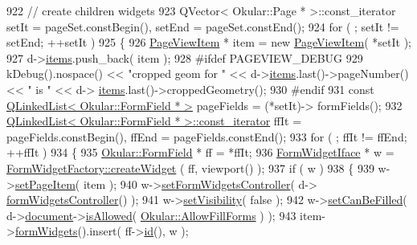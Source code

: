 \begin{DoxyCode}
922     \textcolor{comment}{// create children widgets}
923     QVector< Okular::Page * >::const\_iterator setIt = pageSet.constBegin(), setEnd = pageSet.constEnd();
924     \textcolor{keywordflow}{for} ( ; setIt != setEnd; ++setIt )
925     \{
926         \hyperlink{classPageViewItem}{PageViewItem} * item = \textcolor{keyword}{new} \hyperlink{classPageViewItem}{PageViewItem}( *setIt );
927         d->\hyperlink{classPageViewPrivate_ad90c795dead9abfaa5818a94e00435bc}{items}.push\_back( item );
928 \textcolor{preprocessor}{#ifdef PAGEVIEW\_DEBUG}
929         kDebug().nospace() << \textcolor{stringliteral}{"cropped geom for "} << d->\hyperlink{classPageViewPrivate_ad90c795dead9abfaa5818a94e00435bc}{items}.last()->pageNumber() << \textcolor{stringliteral}{" is "} << d->
      \hyperlink{classPageViewPrivate_ad90c795dead9abfaa5818a94e00435bc}{items}.last()->croppedGeometry();
930 \textcolor{preprocessor}{#endif}
931         \textcolor{keyword}{const} \hyperlink{classQLinkedList}{QLinkedList< Okular::FormField * >} pageFields = (*setIt)->
      formFields();
932         \hyperlink{classQLinkedList}{QLinkedList< Okular::FormField * >::const\_iterator}
       ffIt = pageFields.constBegin(), ffEnd = pageFields.constEnd();
933         \textcolor{keywordflow}{for} ( ; ffIt != ffEnd; ++ffIt )
934         \{
935             \hyperlink{classOkular_1_1FormField}{Okular::FormField} * ff = *ffIt;
936             \hyperlink{classFormWidgetIface}{FormWidgetIface} * w = \hyperlink{classFormWidgetFactory_a94c0bba1709783153ad39beee9f48a41}{FormWidgetFactory::createWidget}
      ( ff, viewport() );
937             \textcolor{keywordflow}{if} ( w )
938             \{
939                 w->\hyperlink{classFormWidgetIface_a67a28f4a30704dc435419eb9ea56a7de}{setPageItem}( item );
940                 w->\hyperlink{classFormWidgetIface_a4d3129afff43729fafc4e6b58a4d16fe}{setFormWidgetsController}( d->
      \hyperlink{classPageViewPrivate_a9265244018f7c818fe3c605397a14540}{formWidgetsController}() );
941                 w->\hyperlink{classFormWidgetIface_a1681c05ca9122ad0c44174856a2e2cb6}{setVisibility}( \textcolor{keyword}{false} );
942                 w->\hyperlink{classFormWidgetIface_a0cef84677236da4810610c781e38b7f8}{setCanBeFilled}( d->\hyperlink{classPageViewPrivate_a50645b9853306cffd74e51efb677e5b4}{document}->\hyperlink{classOkular_1_1Document_a6dd7a475b14222c07d1c410311f35cdb}{isAllowed}( 
      \hyperlink{namespaceOkular_a3601f4e702453ddf1125476dd6e7577ba451db87f0977de39b47316b878722136}{Okular::AllowFillForms} ) );
943                 item->\hyperlink{classPageViewItem_a24394acf608eed67ef99280f6958258d}{formWidgets}().insert( ff->\hyperlink{classOkular_1_1FormField_a88ae3d04b4fbe5fd0fedeb068b3d5071}{id}(), w );

\end{DoxyCode}
